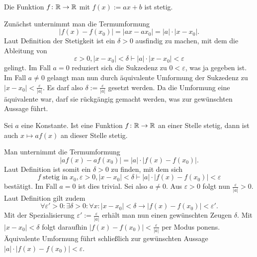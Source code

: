 \begin{Satz}
Die Funktion $f\colon\mathbb R\to\mathbb R$ mit $f(x):=ax+b$ ist stetig.
\end{Satz}
\begin{Beweis}
Zunächst unternimmt man die Termumformung
\[|f(x)-f(x_0)| = |ax-ax_0| = |a|\cdot |x-x_0|.\]
Laut Definition der Stetigkeit ist ein $\delta>0$ ausfindig zu machen,
mit dem die Ableitung von
\[\varepsilon>0, |x-x_0|<\delta\vdash |a|\cdot |x-x_0|<\varepsilon\]
gelingt. Im Fall $a=0$ reduziert sich die Sukzedenz zu
$0<\varepsilon$, was ja gegeben ist. Im Fall $a\ne 0$ gelangt man nun
durch äquivalente Umformung der Sukzedenz zu
$|x-x_0| < \frac{\varepsilon}{|a|}$.
Es darf also $\delta:=\frac{\varepsilon}{|a|}$ gesetzt werden.
Da die Umformung eine äquivalente war, darf sie rückgängig gemacht
werden, was zur gewünschten Aussage führt.\,\qedsymbol
\end{Beweis}

\begin{Satz}
Sei $a$ eine Konstante. Ist eine Funktion $f\colon\mathbb R\to\mathbb R$ an einer
Stelle stetig, dann ist auch $x\mapsto af(x)$ an dieser Stelle stetig.
\end{Satz}
\begin{Beweis}
Man unternimmt die Termumformung
\[|af(x)-af(x_0)| = |a|\cdot |f(x)-f(x_0)|.\]
Laut Definition ist somit ein $\delta>0$ zu finden, mit dem sich
\[f\;\text{stetig in}\;x_0,\varepsilon>0,|x-x_0|<\delta\vdash |a|\cdot |f(x)-f(x_0)|<\varepsilon\]
bestätigt. Im Fall $a=0$ ist dies trivial. Sei also $a\ne 0$.
Aus $\varepsilon>0$ folgt nun $\tfrac{\varepsilon}{|a|}>0$. Laut Definition gilt zudem
\[\forall\varepsilon'>0\colon\exists\delta>0\colon\forall x\colon |x-x_0|<\delta\to |f(x)-f(x_0)|<\varepsilon'.\]
Mit der Spezialisierung $\varepsilon':=\tfrac{\varepsilon}{|a|}$ erhält
man nun einen gewünschten Zeugen $\delta$. Mit $|x-x_0|<\delta$ folgt
daraufhin $|f(x)-f(x_0)|<\tfrac{\varepsilon}{|a|}$ per Modus ponens.
Äquivalente Umformung führt schließlich zur gewünschten Aussage
$|a|\cdot |f(x)-f(x_0)|<\varepsilon$.\,\qedsymbol
\end{Beweis}

